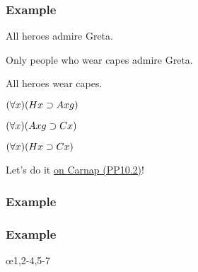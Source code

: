 \begin{frame}
\frametitle{Example}

\begin{earg}
  \item[] All heroes admire Greta.
  \item[] Only people who wear capes admire Greta.
  \item[\therefore] All heroes wear capes.
\end{earg}

\bigskip

\begin{earg}
  \item[] $(\forall x)(Hx \supset Axg)$
  \item[] $(\forall x)(Axg \supset Cx)$
  \item[\therefore] $(\forall x)(Hx \supset Cx)$
\end{earg}

Let's do it \href{https://tinyurl.com/4dst762n}{on Carnap (PP10.2)}!

\end{frame}

\begin{frame}
\frametitle{Example}
\small
\begin{fitchproof}
   \pr{}
   \pr{}
  \open
   
  \close
\end{fitchproof}
\end{frame}

\begin{frame}
  \frametitle{Example}
  \small
  \begin{fitchproof}
     \pr{}
    \open
     
\close
\open
{} 
\close
  \oe{1,2-4,5-7}
  \end{fitchproof}
  \end{frame}

